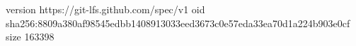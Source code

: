 version https://git-lfs.github.com/spec/v1
oid sha256:8809a380af98545edbb1408913033eed3673c0e57eda33ea70d1a224b903e0cf
size 163398

